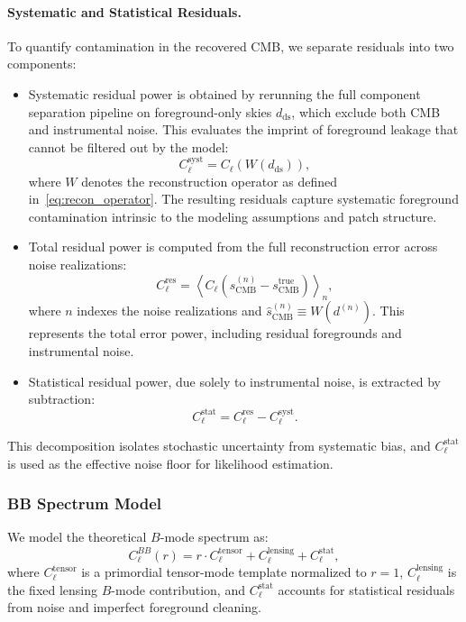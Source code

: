 \documentclass[fleqn,usenatbib]{mnras}
\begin{document}
\paragraph{Systematic and Statistical Residuals.}
To quantify contamination in the recovered CMB, we separate residuals into two components:
\begin{itemize}

    \item Systematic residual power is obtained by rerunning the full component separation pipeline on foreground-only skies \( d_{\mathrm{ds}} \), which exclude both CMB and instrumental noise. This evaluates the imprint of foreground leakage that cannot be filtered out by the model:
    \begin{equation}
    C_\ell^{\mathrm{syst}} = C_\ell \left( W(d_{\mathrm{ds}}) \right),
    \end{equation}
    where \( W \) denotes the reconstruction operator as defined in~\eqref{eq:recon_operator}. The resulting residuals capture systematic foreground contamination intrinsic to the modeling assumptions and patch structure.

    \item Total residual power is computed from the full reconstruction error across noise realizations:
    \begin{equation}
    C_\ell^{\mathrm{res}} = \left\langle C_\ell \left( \hat{s}_{\mathrm{CMB}}^{(n)} - s_{\mathrm{CMB}}^{\mathrm{true}} \right) \right\rangle_{n},
    \end{equation}
    where \( n \) indexes the noise realizations and \( \hat{s}_{\mathrm{CMB}}^{(n)} \equiv W(d^{(n)}) \).
    This represents the total error power, including residual foregrounds and instrumental noise.

    \item Statistical residual power, due solely to instrumental noise, is extracted by subtraction:
    \begin{equation}
    C_\ell^{\mathrm{stat}} = C_\ell^{\mathrm{res}} - C_\ell^{\mathrm{syst}}.
    \end{equation}
\end{itemize}
This decomposition isolates stochastic uncertainty from systematic bias, and \( C_\ell^{\mathrm{stat}} \) is used as the effective noise floor for likelihood estimation.

\subsubsection*{BB Spectrum Model}
We model the theoretical \( B \)-mode spectrum as:
\begin{equation}
C_\ell^{BB}(r) = r \cdot C_\ell^{\mathrm{tensor}} + C_\ell^{\mathrm{lensing}} + C_\ell^{\mathrm{stat}},
\end{equation}
where \( C_\ell^{\mathrm{tensor}} \) is a primordial tensor-mode template normalized to \( r = 1 \), \( C_\ell^{\mathrm{lensing}} \) is the fixed lensing \( B \)-mode contribution, and \( C_\ell^{\mathrm{stat}} \) accounts for statistical residuals from noise and imperfect foreground cleaning.
\end{document}
